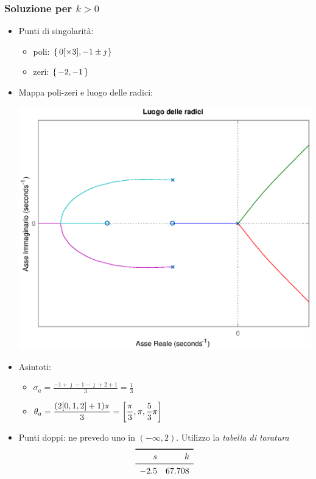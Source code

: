 \subsubsection{Soluzione per \(k>0\)}
\begin{itemize}
	\item Punti di singolarità: \begin{itemize}
		\item poli: \(\set{0 \qty[\times 3], -1\pm\jmath}\)
		\item zeri: \(\set{-2,-1}\)
	\end{itemize}
	\item Mappa poli-zeri e luogo delle radici:
		\begin{center}\includegraphics[scale=.5]{mod1/assets/rl_ex317.eps}\end{center}
	\item Asintoti: \begin{itemize}
		\item \(\displaystyle \sigma_a = \frac{-1+\jmath-1-\jmath+2+1}{3} = \frac{1}{3}\)
		\item \(\displaystyle \theta_a = \frac{\qty(2\qty[0,1,2]+1)\pi}{3} = \qty[\frac{\pi}{3},\pi,\frac{5}{3}\pi]\)
	\end{itemize}
	\item Punti doppi: ne prevedo uno in \((-\infty,2)\). Utilizzo la \emph{tabella di taratura}
		\[\begin{array}{rr}
			\toprule
			s & k \\
			\midrule
			-2.5 & 67.708 \\

\end{array}\]
\end{itemize}
